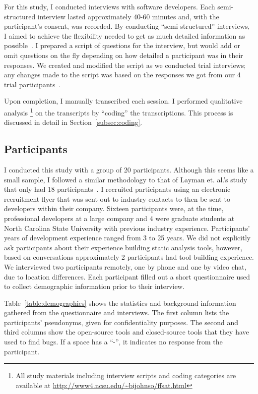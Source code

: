 For this study, I conducted interviews with software developers. Each
semi-structured interview lasted approximately 40-60 minutes and, with the
participant's consent, was recorded. By conducting ``semi-structured''
interviews, I aimed to achieve the flexibility needed to get as much detailed
information as possible~\cite{Hove:2005:Interview}. I prepared a script of
questions for the interview, but would add or omit questions on the fly
depending on how detailed a participant was in their responses.
We created and modified the script as we conducted trial interviews; any changes
made to the script was based on the responses we got from our 4 trial
participants~\cite{Johnson:2012:PreFFSAT}.


Upon completion, I manually transcribed each session. I
performed qualitative analysis \footnote{All study materials including interview
scripts and coding categories are available at
\url{http://www4.ncsu.edu/~bijohnso/ffsat.html}} on the transcripts by
``coding'' the transcriptions. This process is discussed in detail in
Section~\ref{subsec:coding}.

\subsection{Participants}
\label{subsec:participants}

I conducted this study with a group of 20 participants. Although this seems
like a small sample, I followed a similar methodology to that of Layman et.
al.'s study that only had 18 participants~\cite{Layman:2007:FaultFix}.
I recruited participants using an electronic recruitment flyer that was sent
out to industry contacts to then be sent to developers within their company.
Sixteen participants were, at the time, professional developers at a large company and 4
were graduate students at North Carolina State University with previous industry
experience. Participants' years of development experience ranged from 3 to 25
years. We did not explicitly ask participants about their experience building
static analysis tools, however, based on conversations approximately 2
participants had tool building experience. We interviewed two participants
remotely, one by phone and one by video chat, due to location differences. Each
participant filled out a short questionnaire used to collect demographic
information prior to their interview.

Table~\ref{table:demographics} shows the statistics and background information
gathered from the questionnaire and interviews. The first column lists the
participants' pseudonyms, given for confidentiality purposes. The second and
third columns show the open-source tools and closed-source tools that they have
used to find bugs. If a space has a ``-'', it indicates no response from the
participant.  



